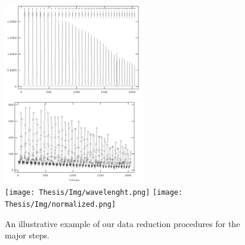 \begin{figure}[t!]
{\includegraphics[width = 0.55\textwidth]{Img/Extraction_of_spectra.png}}
{\includegraphics[width = 0.55\textwidth]{Img/Background_subtraction.png}}\\
{\texttt{[image: Thesis/Img/wavelenght.png]}} 
{\texttt{[image: Thesis/Img/normalized.png]}}\\
\caption{An illustrative example of our data reduction procedures for the major steps.}
\label{reductions}
\end{figure}



